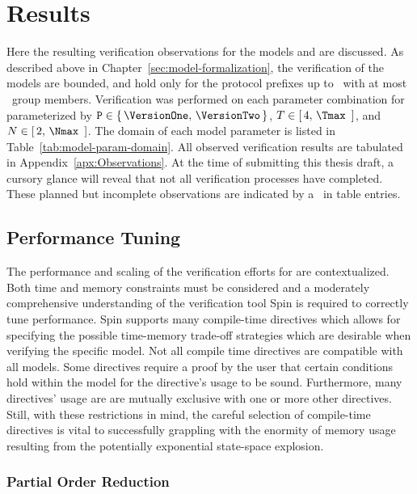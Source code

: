 \hypertarget{sec:results}{%
\chapter{Results}\label{sec:results}}

Here the resulting verification observations for the models \CGKAmod{\VersionOne}{}{} and \CGKAmod{\VersionTwo}{}{} are discussed.
As described above in Chapter\ \ref{sec:model-formalization}, the verification of the models are bounded, and hold only for the protocol prefixes up to \Tmax\ with at most \Nmax\ group members.
Verification was performed on each parameter combination for  parameterized by \( \mathtt{P} \in \{\,\VersionOne,\, \VersionTwo\,\} \), \( T \in [\,4,\, \Tmax\ \,] \), and \( N \in [\,2,\, \Nmax\ \,] \).
The domain of each  model parameter is listed in Table\ \ref{tab:model-param-domain}.
All observed verification results are tabulated in Appendix\ \ref{apx:Observations}.
At the time of submitting this thesis draft, a cursory glance will reveal that not all verification processes have completed.
These planned but incomplete observations are indicated by a \NA\ in table entries.


\hypertarget{performance-tuning}{%
\section{Performance Tuning}\label{performance-tuning}}

The performance and scaling of the verification efforts for \CGKAmod{}{}{} are contextualized.
Both time and memory constraints must be considered and a moderately comprehensive understanding of the verification tool Spin is required to correctly tune performance.
Spin supports many compile-time directives which allows for specifying the possible time-memory trade-off strategies which are desirable when verifying the specific model.
Not all compile time directives are compatible with all models.
Some directives require a proof by the user that certain conditions hold within the model for the directive's usage to be sound.
Furthermore, many directives' usage are are mutually exclusive with one or more other directives.
Still, with these restrictions in mind, the careful selection of compile-time directives is vital to successfully grappling with the enormity of memory usage resulting from the potentially exponential state-space explosion.


\hypertarget{sec:partial-order-reduction}{%
\subsection{Partial Order Reduction}\label{sec:partial-order-reduction}}


